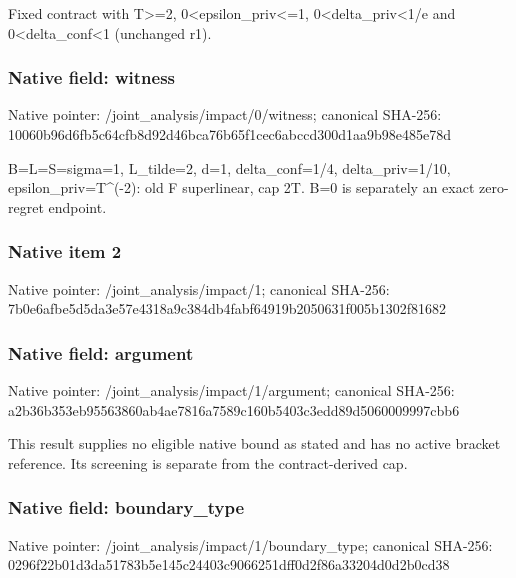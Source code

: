 \documentclass[10pt,a4paper]{article}
\begin{document}
\begingroup\raggedright\sloppy Fixed contract with T>=\allowbreak{}2,\allowbreak{} 0<epsilon\_\allowbreak{}priv<=\allowbreak{}1,\allowbreak{} 0<delta\_\allowbreak{}priv<1/\allowbreak{}e and 0<delta\_\allowbreak{}conf<1 (unchanged r1).\par\endgroup

\subsubsection{Native field: witness}
Native pointer: /joint\_\allowbreak{}analysis/impact/0/witness; canonical SHA-256: 10060b96d6fb5c64cfb8d92d46bca76b65f1cec6abccd300d1aa9b98e485e78d

\begingroup\raggedright\sloppy B=\allowbreak{}L=\allowbreak{}S=\allowbreak{}sigma=\allowbreak{}1,\allowbreak{} L\_\allowbreak{}tilde=\allowbreak{}2,\allowbreak{} d=\allowbreak{}1,\allowbreak{} delta\_\allowbreak{}conf=\allowbreak{}1/\allowbreak{}4,\allowbreak{} delta\_\allowbreak{}priv=\allowbreak{}1/\allowbreak{}10,\allowbreak{} epsilon\_\allowbreak{}priv=\allowbreak{}T\textasciicircum{}(-2):\allowbreak{} old F superlinear,\allowbreak{} cap 2T. B=\allowbreak{}0 is separately an exact zero-regret endpoint.\par\endgroup

\subsubsection{Native item 2}
Native pointer: /joint\_\allowbreak{}analysis/impact/1; canonical SHA-256: 7b0e6afbe5d5da3e57e4318a9c384db4fabf64919b2050631f005b1302f81682

\subsubsection{Native field: argument}
Native pointer: /joint\_\allowbreak{}analysis/impact/1/argument; canonical SHA-256: a2b36b353eb95563860ab4ae7816a7589c160b5403c3edd89d5060009997cbb6

\begingroup\raggedright\sloppy This result supplies no eligible native bound as stated and has no active bracket reference. Its screening is separate from the contract-derived cap.\par\endgroup

\subsubsection{Native field: boundary\_\allowbreak{}type}
Native pointer: /joint\_\allowbreak{}analysis/impact/1/boundary\_\allowbreak{}type; canonical SHA-256: 0296f22b01d3da51783b5e145c24403c9066251dff0d2f86a33204d0d2b0cd38
\end{document}
